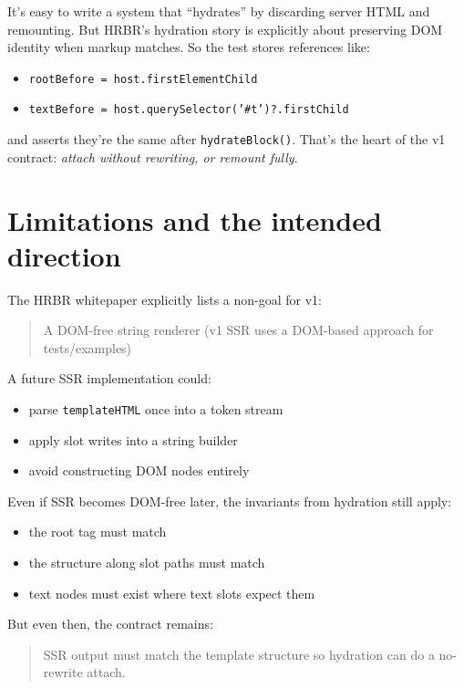 It’s easy to write a system that “hydrates” by discarding server HTML and remounting.
But HRBR’s hydration story is explicitly about preserving DOM identity when markup matches.
So the test stores references like:

\begin{itemize}
  \item \texttt{rootBefore = host.firstElementChild}
  \item \texttt{textBefore = host.querySelector('\#t')?.firstChild}
\end{itemize}

and asserts they’re the same after \texttt{hydrateBlock()}.
That’s the heart of the v1 contract: \emph{attach without rewriting, or remount fully}.

\section{Limitations and the intended direction}

The HRBR whitepaper explicitly lists a non-goal for v1:

\begin{quote}
A DOM-free string renderer (v1 SSR uses a DOM-based approach for tests/examples)
\end{quote}

A future SSR implementation could:

\begin{itemize}
  \item parse \texttt{templateHTML} once into a token stream
  \item apply slot writes into a string builder
  \item avoid constructing DOM nodes entirely
\end{itemize}

Even if SSR becomes DOM-free later, the invariants from hydration still apply:

\begin{itemize}
  \item the root tag must match
  \item the structure along slot paths must match
  \item text nodes must exist where text slots expect them
\end{itemize}

But even then, the contract remains:

\begin{quote}
SSR output must match the template structure so hydration can do a no-rewrite attach.
\end{quote}


